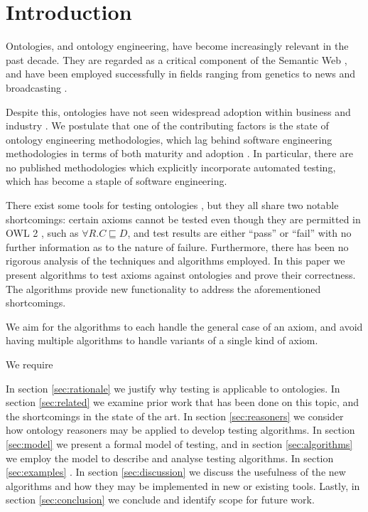 \documentclass[paper.tex]{subfiles}
\begin{document}
\section{Introduction}
\label{sec:intro}

Ontologies, and ontology engineering, have become increasingly relevant in the past decade.
They are regarded as a critical component of the Semantic Web \cite{BernersLee:SemanticWeb}, and have been employed successfully in fields ranging from genetics \cite{GeneOntology:GoingForward} to news and broadcasting \cite{BBC:LinkedData}.

Despite this, ontologies have not seen widespread adoption within business and industry \cite{Kaczmarek:EnterpriseModelling}.
We postulate that one of the contributing factors is the state of ontology engineering methodologies, which lag behind software engineering methodologies in terms of both maturity and adoption \cite{Iqbal:Methodologies, Simperl:Maturity}.
In particular, there are no published methodologies which explicitly incorporate automated testing, which has become a staple of software engineering.

There exist some tools for testing ontologies \cite{Lawrynowicz:TDDontoTool, Warrender:HowWhatWhyTest, Scone:Bitbucket}, but they all share two notable shortcomings: certain axioms cannot be tested even though they are permitted in OWL 2 \cite{W3C:OWL2Syntax}, such as $\forall R.C \sqsubseteq D$, and test results are either ``pass'' or ``fail'' with no further information as to the nature of failure.
Furthermore, there has been no rigorous analysis of the techniques and algorithms employed.
In this paper we present algorithms to test axioms against ontologies and prove their correctness.  \todo[performance?]
The algorithms provide new functionality to address the aforementioned shortcomings.

We aim for the algorithms to each handle the general case of an axiom, and avoid having multiple algorithms to handle variants of a single kind of axiom.

We require 

In section \ref{sec:rationale} we justify why testing is applicable to ontologies.
In section \ref{sec:related} we examine prior work that has been done on this topic, and the shortcomings in the state of the art.
In section \ref{sec:reasoners} we consider how ontology reasoners may be applied to develop testing algorithms.
In section \ref{sec:model} we present a formal model of testing, and in section \ref{sec:algorithms} we employ the model to describe and analyse testing algorithms.
In section \ref{sec:examples} \todo.
In section \ref{sec:discussion} we discuss the usefulness of the new algorithms and how they may be implemented in new or existing tools.
Lastly, in section \ref{sec:conclusion} we conclude and identify scope for future work.
\end{document}
